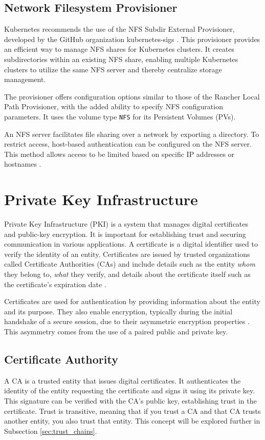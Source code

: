 \subsection{Network Filesystem Provisioner} 

Kubernetes recommends the use of the NFS Subdir External Provisioner, developed by the GitHub organization kubernetes-sigs \cite{kubernetes_storage_classes_nfs}. This provisioner provides an efficient way to manage NFS shares for Kubernetes clusters. It creates subdirectories within an existing NFS share, enabling multiple Kubernetes clusters to utilize the same NFS server and thereby centralize storage management.

The provisioner offers configuration options similar to those of the Rancher Local Path Provisioner, with the added ability to specify NFS configuration parameters. It uses the volume type \texttt{NFS} for its Persistent Volumes (PVs).

An NFS server facilitates file sharing over a network by exporting a directory. To restrict access, host-based authentication can be configured on the NFS server. This method allows access to be limited based on specific IP addresses or hostnames \cite{ubuntu_nfs_setup}.

\section{Private Key Infrastructure}

Private Key Infrastructure (PKI) is a system that manages digital certificates and public-key encryption. It is important for establishing trust and securing communication in various applications. A certificate is a digital identifier used to verify the identity of an entity. Certificates are issued by trusted organizations called Certificate Authorities (CAs) and include details such as the entity \textit{whom} they belong to, \textit{what} they verify, and details about the certificate itself such as the certificate's expiration date \cite{ibm_digital_certificates}.

Certificates are used for authentication by providing information about the entity and its purpose. They also enable encryption, typically during the initial handshake of a secure session, due to their asymmetric encryption properties \cite{cloudflare_tls_handshake}. This asymmetry comes from the use of a paired public and private key.

\subsection{Certificate Authority}
A CA is a trusted entity that issues digital certificates. It authenticates the identity of the entity requesting the certificate and signs it using its private key. This signature can be verified with the CA's public key, establishing trust in the certificate. Trust is transitive, meaning that if you trust a CA and that CA trusts another entity, you also trust that entity. This concept will be explored further in Subsection \ref{sec:trust_chains}.

